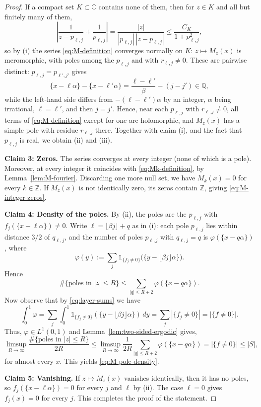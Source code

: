 \documentclass[reqno,a4paper,12pt]{amsart}
\numberwithin{equation}{section}
\def\Z{{\mathbb Z}}
\def\C{{\mathbb C}}
\def\Q{{\mathbb Q}}
\newcommand\1{\mathds{1}}
\begin{document}
\begin{proof}
If a compact set $K\subset\C$
contains none of them, then for $z\in K$ and all but finitely many of
them,
\[
 \left|\frac1{z-p_{\ell,j}}+\frac1{p_{\ell,j}}\right|
 =\frac{|z|}{|p_{\ell,j}|\,|z-p_{\ell,j}|}
 \leq\frac{C_K}{1+p_{\ell,j}^2},
\]
so by (i) the series \eqref{eq:M-definition} converges normally on
$K$: $z\mapsto M_z(x)$ is meromorphic, with poles among the
$p_{\ell,j}$ and with $r_{\ell,j}\ne0$.  These are pairwise distinct:
$p_{\ell,j}=p_{\ell',j'}$ gives
\[
 \{x-\ell\alpha\}-\{x-\ell'\alpha\}
 =\frac{\ell-\ell'}{\beta}-(j-j')\in\Q,
\]
while the left-hand side differs from $-(\ell-\ell')\alpha$ by an
integer, $\alpha$ being irrational, $\ell=\ell'$, and then $j=j'$.
Hence, near each $p_{\ell,j}$ with $r_{\ell,j}\ne0$, all terms of
\eqref{eq:M-definition} except for one are holomorphic, and $M_z(x)$ has a
simple pole with residue $r_{\ell,j}$ there.  Together with claim (i), and the fact that $p_{\ell,j}$ is real, we obtain (ii) and (iii).

\smallskip\noindent\textbf{Claim 3: Zeros.}
The series converges at every integer (none of which is a pole). Moreover, at every integer it coincides with \eqref{eq:Mk-definition}, by
Lemma~\ref{lem:M-fourier}. Discarding one more null set, we have $M_k(x)=0$
for every $k\in\Z$.  If $M_z(x)$ is not identically zero, its zeros contain $\Z$, giving
\eqref{eq:M-integer-zeros}.

\smallskip\noindent\textbf{Claim 4: Density of the poles.}
By (ii), the poles are the $p_{\ell,j}$ with $f_j(\{x-\ell\alpha\})\ne0$.
Write $\ell=\lfloor\beta j\rfloor+q$ as in (i): each pole $p_{\ell,j}$
lies within distance $3/2$ of $q_{\ell,j}$, and the number of poles $p_{\ell,j}$
with $q_{\ell,j}=q$ is $\varphi(\{x-q\alpha\})$, where
\[
 \varphi(y):=\sum_j\1_{\{f_j\ne0\}}\bigl(\{y-\lfloor\beta j\rfloor\alpha\}\bigr).
\]
Hence
\[
 \#\{\text{poles in }|z|\leq R\}\leq\sum_{|q|\leq R+2}\varphi(\{x-q\alpha\}).
\]
Now observe that by \eqref{eq:layer-sums} we have
$$
\int_0^1\varphi
=\sum_j\int_0^1\1_{\{f_j\ne0\}}(\{y-\lfloor\beta j\rfloor\alpha\})\,dy
=\sum_j|\{f_j\ne0\}|=|\{f\ne0\}|.
$$
Thus,
$\varphi\in L^1(0,1)$ and Lemma~\ref{lem:two-sided-ergodic} gives,
\[
 \limsup_{R\to\infty}\frac{\#\{\text{poles in }|z|\leq R\}}{2R}
 \leq\limsup_{R\to\infty}\frac1{2R}\sum_{|q|\leq R+2}\varphi(\{x-q\alpha\})
 =|\{f\ne0\}|\leq|S|,
\]
for almost every $x$. This yields \eqref{eq:M-pole-density}.

\smallskip\noindent\textbf{Claim 5: Vanishing.}
If $z\mapsto M_z(x)$ vanishes identically, then it has no poles, so $f_j(\{x-\ell\alpha\})=0$ for every $j$ and $\ell$ by (ii). The case $\ell=0$ gives $f_j(x)=0$ for every $j$. This completes the proof of the statement.
\end{proof}
\end{document}
